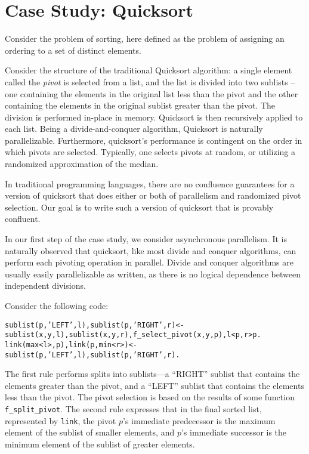 \section{Case Study: Quicksort}
\label{sec:qscs}


Consider the problem of sorting, here defined as the problem of assigning an ordering to a set of distinct elements.

Consider the structure of the traditional Quicksort algorithm: a single element called the {\em pivot} is selected from a list, and the list is divided into two sublists -- one containing the elements in the original list less than the pivot and the other containing the elements in the original sublist greater than the pivot.  The division is performed in-place in memory.  Quicksort is then recursively applied to each list.  Being a divide-and-conquer algorithm, Quicksort is naturally parallelizable.  Furthermore, quicksort's performance is contingent on the order in which pivots are selected.  Typically, one selects pivots at random, or utilizing a randomized approximation of the median.

In traditional programming languages, there are no confluence guarantees for a version of quicksort that does either or both of parallelism and randomized pivot selection.  Our goal is to write such a version of quicksort that is provably confluent.

In our first step of the case study, we consider asynchronous parallelism.  It is naturally observed that quicksort, like most divide and conquer algorithms, can perform each pivoting operation in parallel.  Divide and conquer algorithms are usually easily parallelizable as written, as there is no logical dependence between independent divisions.

Consider the following code:

\begin{alltt}
sublist(p,'LEFT',l), sublist(p,'RIGHT',r) <- sublist(x,y,l), sublist(x,y,r), f_select_pivot(x,y,p), l < p, r > p.
link(max<l>,p), link(p,min<r>) <- sublist(p,'LEFT',l), sublist(p,'RIGHT',r).
\end{alltt}

The first rule performs splits into sublists---a ``RIGHT'' sublist that contains the elements greater than the pivot, and a ``LEFT'' sublist that contains the elements less than the pivot.  The pivot selection is based on the results of some function {\tt f\_split\_pivot}.  The second rule expresses that in the final sorted list, represented by {\tt link}, the pivot $p$'s immediate predecessor is the maximum element of the sublist of smaller elements, and $p$'s immediate successor is the minimum element of the sublist of greater elements.

